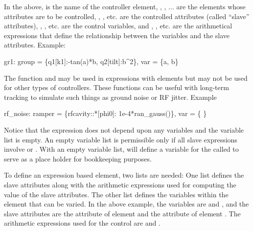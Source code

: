 In the above,  is the name of the controller element, , , ... are the
elements whose attributes are to be controlled, , , etc. are the controlled
attributes (called ``slave'' attributes), , , etc. are the control variables, and
, , etc. are the arithmetical expressions that define the relationship between the
variables and the slave attributes. Example:
\begin{example}
  gr1: group = \{q1[k1]:-tan(a)*b, q2[tilt]:b^2\}, var = \{a, b\}
\end{example}

The function  and  may be used in expressions with  elements but
may not be used for other types of controllers. These functions can be useful with long-term tracking
to simulate such things as ground noise or RF jitter. Example
\begin{example}
  rf_noise: ramper = \{rfcavity::*[phi0]: 1e-4*ran_gauss()\}, var = \{ \}
\end{example}
Notice that the expression does not depend upon any variables and the variable list is empty. An empty
variable list is permissible only if all slave expressions involve  or .
With an empty variable list, \bmad will define a variable for the  called  to serve
as a place holder for bookkeeping purposes. 

To define an expression based  element, two lists are needed: One list defines the
slave attributes along with the arithmetic expressions used for computing the value of the slave
attributes. The other list defines the variables within the  element that can be
varied. In the above example, the variables are  and , and the slave attributes are the
 attribute of element  and the  attribute of element . The arithmetic
expressions used for the control are  and .

